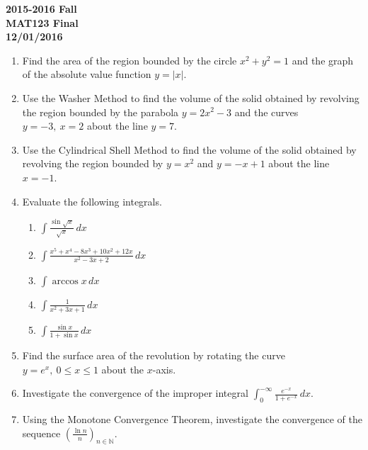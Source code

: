 \documentclass[a4paper, 12pt]{article}
\begin{document}
\pagestyle{empty}

\begin{center}
\textbf{2015-2016 Fall\\MAT123 Final\\12/01/2016}
\end{center}

\begin{enumerate}[leftmargin=*,label=\textbf{\arabic*.}]

\item Find the area of the region bounded by the circle $x^2+y^2=1$ and the graph of the absolute value function $y=\left|x\right|$.

\item Use the Washer Method to find the volume of the solid obtained by revolving the region bounded by the parabola $y=2x^2-3$ and the curves $y=-3,\:x=2$ about the line $y=7$.

\item Use the Cylindrical Shell Method to find the volume of the solid obtained by revolving the region bounded by $y=x^2$ and $y=-x+1$ about the line $x=-1$.

\item Evaluate the following integrals.

\begin{enumerate}[leftmargin=*,label=\textbf{\alph*.}]
\item $\displaystyle\int\frac{\sin \sqrt x}{\sqrt x}\,dx$
\item $\displaystyle\int\frac{x^5+x^4-8x^3+10x^2+12x}{x^2-3x+2}\,dx$
\item $\displaystyle\int\arccos x\,dx$
\item $\displaystyle\int\frac1{x^2+3x+1}\,dx$
\item $\displaystyle\int\frac{\sin x}{1+\sin x}\,dx$
\end{enumerate}

\item Find the surface area of the revolution by rotating the curve $y= e^x,\:0\leq x\leq1$ about the $x$-axis.

\item Investigate the convergence of the improper integral $\displaystyle\int_0^{-\infty}\frac{ e^{-x}}{1+ e^{-x}}\,dx$.

\item Using the Monotone Convergence Theorem, investigate the convergence of the sequence $\displaystyle\left(\frac{\ln n}n\right)_{n\in\mathbb{N}}$.

\end{enumerate}
\end{document}
